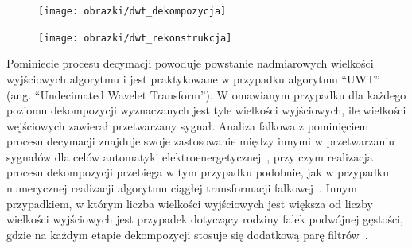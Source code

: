 \begin{figure}[htb!]
\begin{center}
\texttt{[image: obrazki/dwt\_dekompozycja]}
\end{center}
\end{figure}

\begin{figure}[htb!]
\begin{center}
\texttt{[image: obrazki/dwt\_rekonstrukcja]}
\end{center}
\end{figure}

Pominiecie procesu decymacji powoduje powstanie nadmiarowych wielkości wyjściowych algorytmu i jest praktykowane w przypadku algorytmu \enquote{UWT} (ang. \enquote{Undecimated Wavelet Transform}). W omawianym przypadku dla każdego poziomu dekompozycji wyznaczanych jest tyle wielkości wyjściowych, ile wielkości wejściowych zawierał przetwarzany sygnał. Analiza falkowa z pominięciem procesu decymacji znajduje swoje zastosowanie między innymi w przetwarzaniu sygnałów dla celów automatyki elektroenergetycznej~\cite{niedopytalski_ene}, przy czym realizacja procesu dekompozycji przebiega w tym przypadku podobnie, jak w przypadku numerycznej realizacji algorytmu ciągłej transformacji falkowej~\cite{lord_guide}. Innym przypadkiem, w którym liczba wielkości wyjściowych jest większa od liczby wielkości wyjściowych jest przypadek dotyczący rodziny falek podwójnej gęstości, gdzie na każdym etapie dekompozycji stosuje się dodatkową parę filtrów~\cite{selenick_ddenusage}.

